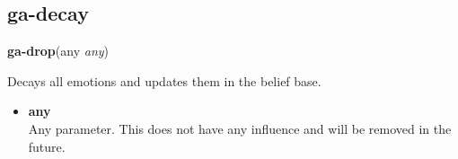 \subsection{ga-decay}

\textbf{ga-drop}(any \emph{any})

Decays all emotions and updates them in the belief base.

\begin{itemize}
	\item \textbf{any} \\ Any parameter. This does not have any influence and will be removed in the future.
\end{itemize}



